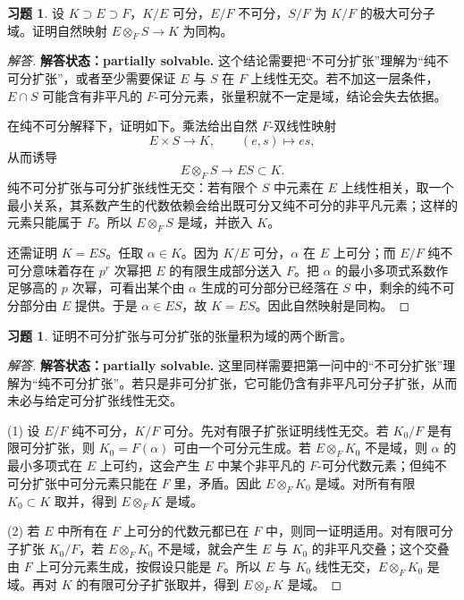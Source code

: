 \documentclass[11pt,a4paper,openany]{ctexbook}
\numberwithin{equation}{chapter}
\theoremstyle{plain}
\theoremstyle{definition}
\newtheorem{exercise}[theorem]{习题}
\theoremstyle{remark}
\begin{document}
\begin{exercise}
设 $K\supset E\supset F$，$K/E$ 可分，$E/F$ 不可分，$S/F$ 为 $K/F$ 的极大可分子域。证明自然映射 $E\otimes_FS\to K$ 为同构。
\end{exercise}

\begin{proof}[解答]
\textbf{解答状态：partially solvable.}
这个结论需要把“不可分扩张”理解为“纯不可分扩张”，或者至少需要保证
$E$ 与 $S$ 在 $F$ 上线性无交。若不加这一层条件，$E\cap S$ 可能含有非平凡的
$F$-可分元素，张量积就不一定是域，结论会失去依据。

在纯不可分解释下，证明如下。乘法给出自然 $F$-双线性映射
\[
E\times S\to K,\qquad (e,s)\mapsto es,
\]
从而诱导
\[
E\otimes_FS\to ES\subset K.
\]
纯不可分扩张与可分扩张线性无交：若有限个 $S$ 中元素在 $E$ 上线性相关，取一个最小关系，其系数产生的代数依赖会给出既可分又纯不可分的非平凡元素；这样的元素只能属于
$F$。所以 $E\otimes_FS$ 是域，并嵌入 $K$。

还需证明 $K=ES$。任取 $\alpha\in K$。因为 $K/E$ 可分，$\alpha$ 在
$E$ 上可分；而 $E/F$ 纯不可分意味着存在 $p^r$ 次幂把 $E$ 的有限生成部分送入
$F$。把 $\alpha$ 的最小多项式系数作足够高的 $p$ 次幂，可看出某个由
$\alpha$ 生成的可分部分已经落在 $S$ 中，剩余的纯不可分部分由 $E$ 提供。于是
\(\alpha\in ES\)，故 $K=ES$。因此自然映射是同构。
\end{proof}

\begin{exercise}
证明不可分扩张与可分扩张的张量积为域的两个断言。
\end{exercise}

\begin{proof}[解答]
\textbf{解答状态：partially solvable.}
这里同样需要把第一问中的“不可分扩张”理解为“纯不可分扩张”。若只是非可分扩张，它可能仍含有非平凡可分子扩张，从而未必与给定可分扩张线性无交。

(1) 设 $E/F$ 纯不可分，$K/F$ 可分。先对有限子扩张证明线性无交。若
$K_0/F$ 是有限可分扩张，则 $K_0=F(\alpha)$ 可由一个可分元生成。若
$E\otimes_FK_0$ 不是域，则 $\alpha$ 的最小多项式在 $E$ 上可约，这会产生
$E$ 中某个非平凡的 $F$-可分代数元素；但纯不可分扩张中可分元素只能在
$F$ 里，矛盾。因此 $E\otimes_FK_0$ 是域。对所有有限 $K_0\subset K$ 取并，得到
$E\otimes_FK$ 是域。

(2) 若 $E$ 中所有在 $F$ 上可分的代数元都已在 $F$ 中，则同一证明适用。对有限可分子扩张
$K_0/F$，若 $E\otimes_FK_0$ 不是域，就会产生 $E$ 与 $K_0$ 的非平凡交叠；这个交叠由
$F$ 上可分元素生成，按假设只能是 $F$。所以 $E$ 与 $K_0$ 线性无交，$E\otimes_FK_0$ 是域。再对
$K$ 的有限可分子扩张取并，得到 $E\otimes_FK$ 是域。
\end{proof}
\end{document}
